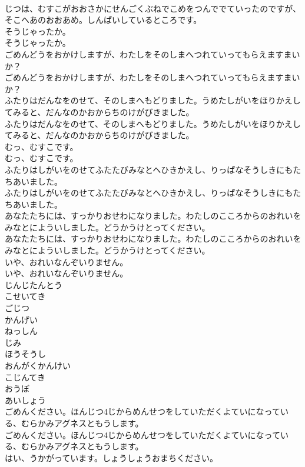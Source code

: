 \documentclass[8pt]{extreport}
\begin{document}
\begin{CJK}{UTF8}{min}
\\	じつは、むすこがおおさかにせんごくぶねでこめをつんででていったのですが、そこへあのおおあめ。しんぱいしているところです。
\\	そうじゃったか。
\\	そうじゃったか。
\\	ごめんどうをおかけしますが、わたしをそのしまへつれていってもらえますまいか？
\\	ごめんどうをおかけしますが、わたしをそのしまへつれていってもらえますまいか？
\\	ふたりはだんなをのせて、そのしまへもどりました。うめたしがいをほりかえしてみると、だんなのかおからちのけがびきました。
\\	ふたりはだんなをのせて、そのしまへもどりました。うめたしがいをほりかえしてみると、だんなのかおからちのけがびきました。
\\	むっ、むすこです。
\\	むっ、むすこです。
\\	ふたりはしがいをのせてふたたびみなとへひきかえし、りっぱなそうしきにもたちあいました。
\\	ふたりはしがいをのせてふたたびみなとへひきかえし、りっぱなそうしきにもたちあいました。
\\	あなたたちには、すっかりおせわになりました。わたしのこころからのおれいをみなとによういしました。どうかうけとってください。
\\	あなたたちには、すっかりおせわになりました。わたしのこころからのおれいをみなとによういしました。どうかうけとってください。
\\	いや、おれいなんぞいりません。
\\	いや、おれいなんぞいりません。
\\	じんじたんとう
\\	こせいてき
\\	ごじつ
\\	かんげい
\\	ねっしん
\\	じみ
\\	ほうそうし
\\	おんがくかんけい
\\	こじんてき
\\	おうぼ
\\	あいしょう
\\	ごめんください。ほんじつ4じからめんせつをしていただくよていになっている、むらかみアグネスともうします。
\\	ごめんください。ほんじつ4じからめんせつをしていただくよていになっている、むらかみアグネスともうします。
\\	はい、うかがっています。しょうしょうおまちください。

\end{CJK}
\end{document}
